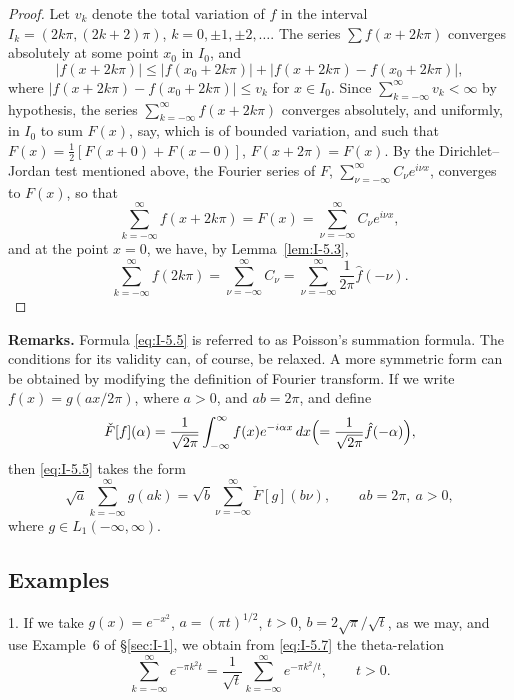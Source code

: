 \begin{proof}
Let $v_k$ denote the total variation of $f$ in the interval $I_k=(2k\pi,(2k+2)\pi)$, $k=0,\pm1,\pm2,\dots$. The series $\sum f(x+2k\pi)$ converges absolutely at some point $x_0$ in $I_0$, and
\begin{equation*}
|f(x+2k\pi)|\le|f(x_0+2k\pi)|+|f(x+2k\pi)-f(x_0+2k\pi)|,
\end{equation*}
where $|f(x+2k\pi)-f(x_0+2k\pi)|\le v_k$ for $x\in I_0$. Since $\sum_{k=-\infty}^\infty v_k<\infty$ by hypothesis, the series $\sum_{k=-\infty}^\infty f(x+2k\pi)$ converges absolutely, and uniformly, in $I_0$ to sum $F(x)$, say, which is of bounded variation, and such that $F(x)=\frac12[F(x+0)+F(x-0)]$, $F(x+2\pi)=F(x)$. By the Dirichlet--Jordan test mentioned above, the Fourier series of $F$, $\sum_{\nu=-\infty}^\infty C_\nu e^{i\nu x}$, converges to $F(x)$, so that
\begin{equation*}
\sum_{k=-\infty}^{\infty}f(x+2k\pi)=F(x)=\sum_{\nu=-\infty}^{\infty}C_\nu e^{i\nu x},
\end{equation*}
and at the point $x=0$, we have, by Lemma~\ref{lem:I-5.3},
\begin{equation*}
\sum_{k=-\infty}^{\infty}f(2k\pi)
=\sum_{\nu=-\infty}^{\infty}C_\nu
=\sum_{\nu=-\infty}^{\infty}\frac{1}{2\pi}\hat f(-\nu).
\end{equation*}
\end{proof}

\noindent\textbf{Remarks.}
Formula \eqref{eq:I-5.5} is referred to as Poisson's summation formula. The conditions for its validity can, of course, be relaxed. A more symmetric form can be obtained by modifying the definition of Fourier transform. If we write $f(x)=g(ax/2\pi)$, where $a>0$, and $ab=2\pi$, and define
\begin{equation}\label{eq:I-5.6}
\check F[f](\alpha)=\frac{1}{\sqrt{2\pi}}\int_{-\infty}^{\infty}f(x)e^{-i\alpha x}\,dx
\Bigl(=\frac{1}{\sqrt{2\pi}}\hat f(-\alpha)\Bigr),
\end{equation}
then \eqref{eq:I-5.5} takes the form
\begin{equation}\label{eq:I-5.7}
\sqrt{a}\sum_{k=-\infty}^{\infty}g(ak)
=\sqrt{b}\sum_{\nu=-\infty}^{\infty}\check F[g](b\nu),
\qquad ab=2\pi,\ a>0,
\end{equation}
where $g\in L_1(-\infty,\infty)$.

\subsection*{Examples}
1. If we take $g(x)=e^{-x^2}$, $a=(\pi t)^{1/2}$, $t>0$, $b=2\sqrt{\pi}/\sqrt{t}$, as we may, and use Example~6 of \S\ref{sec:I-1}, we obtain from \eqref{eq:I-5.7} the theta-relation
\begin{equation}\label{eq:I-5.8}
\sum_{k=-\infty}^{\infty}e^{-\pi k^2 t}
=\frac{1}{\sqrt{t}}\sum_{k=-\infty}^{\infty}e^{-\pi k^2/t},
\qquad t>0.
\end{equation}

